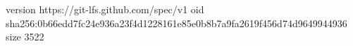 version https://git-lfs.github.com/spec/v1
oid sha256:0b66edd7fc24e936a23f4d1228161e85e0b8b7a9fa2619f456d74d9649944936
size 3522
